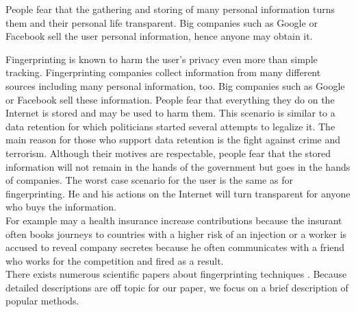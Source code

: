 			
			
			People fear that the gathering and storing of many personal information turns them and their personal life transparent. Big companies such as Google or Facebook sell the user personal information, hence anyone may obtain it. 
			
			
			Fingerprinting is known to harm the user's privacy even more than simple tracking. Fingerprinting companies collect information from many different sources including many personal information, too. Big companies such as Google or Facebook sell these information. People fear that everything they do on the Internet is stored and may be used to harm them. This scenario is similar to a data retention for which politicians started several attempts to legalize it. The main reason for those who support data retention is the fight against crime and terrorism. Although their motives are respectable, people fear that the stored information will not remain in the hands of the government but goes in the hands of companies. The worst case scenario for the user is the same as for fingerprinting. He and his actions on the Internet will turn transparent for anyone who buys the information. \\
			
			For example may a health insurance increase contributions because the insurant often books journeys to countries with a higher risk of an injection or a worker is accused to reveal company secretes because he often communicates with a friend who works for the competition and fired as a result. \\
			
			
			
			
			There exists numerous scientific papers about fingerprinting techniques \cite{paulstone_historysniffing, MBYS11, Nikiforakis:2013:CME:2497621.2498133, Eckersley:2010:UYW:1881151.1881152, MS12, olejnik:hal-00747841}. Because detailed descriptions are off topic for our paper, we focus on a brief description of popular methods. %
			
